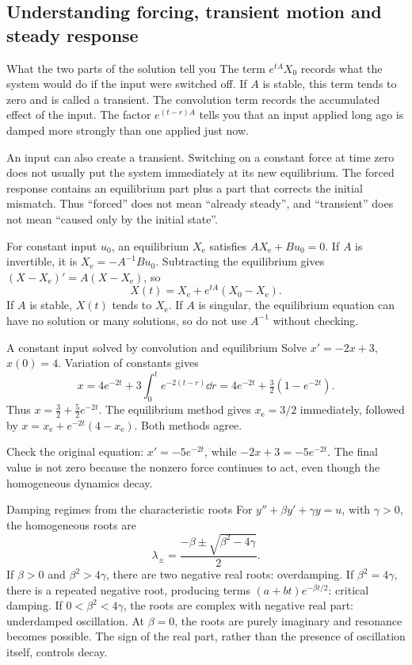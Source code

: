 \subsection{Understanding forcing, transient motion and steady response}
\begin{concept}{What the two parts of the solution tell you}
The term $e^{tA}X_0$ records what the system would do if the input were switched off. If $A$ is stable, this term tends to zero and is called a transient. The convolution term records the accumulated effect of the input. The factor $e^{(t-r)A}$ tells you that an input applied long ago is damped more strongly than one applied just now.

An input can also create a transient. Switching on a constant force at time zero does not usually put the system immediately at its new equilibrium. The forced response contains an equilibrium part plus a part that corrects the initial mismatch. Thus ``forced'' does not mean ``already steady'', and ``transient'' does not mean ``caused only by the initial state''.

For constant input $u_0$, an equilibrium $X_{\mathrm e}$ satisfies $AX_{\mathrm e}+Bu_0=0$. If $A$ is invertible, it is $X_{\mathrm e}=-A^{-1}Bu_0$. Subtracting the equilibrium gives $(X-X_{\mathrm e})'=A(X-X_{\mathrm e})$, so
\[X(t)=X_{\mathrm e}+e^{tA}(X_0-X_{\mathrm e}).\]
If $A$ is stable, $X(t)$ tends to $X_{\mathrm e}$. If $A$ is singular, the equilibrium equation can have no solution or many solutions, so do not use $A^{-1}$ without checking.
\end{concept}
\begin{worked}{A constant input solved by convolution and equilibrium}
Solve $x'=-2x+3$, $x(0)=4$. Variation of constants gives
\[x=4e^{-2t}+3\int_0^t e^{-2(t-r)}\dd r=4e^{-2t}+\tfrac32(1-e^{-2t}).\]
Thus $x=\tfrac32+\tfrac52e^{-2t}$. The equilibrium method gives $x_{\mathrm e}=3/2$ immediately, followed by $x=x_{\mathrm e}+e^{-2t}(4-x_{\mathrm e})$. Both methods agree.

Check the original equation: $x'=-5e^{-2t}$, while $-2x+3=-5e^{-2t}$. The final value is not zero because the nonzero force continues to act, even though the homogeneous dynamics decay.
\end{worked}
\begin{concept}{Damping regimes from the characteristic roots}
For $y''+\beta y'+\gamma y=u$, with $\gamma>0$, the homogeneous roots are
\[\lambda_{\pm}=\frac{-\beta\pm\sqrt{\beta^2-4\gamma}}2.\]
If $\beta>0$ and $\beta^2>4\gamma$, there are two negative real roots: overdamping. If $\beta^2=4\gamma$, there is a repeated negative root, producing terms $(a+bt)e^{-\beta t/2}$: critical damping. If $0<\beta^2<4\gamma$, the roots are complex with negative real part: underdamped oscillation. At $\beta=0$, the roots are purely imaginary and resonance becomes possible. The sign of the real part, rather than the presence of oscillation itself, controls decay.
\end{concept}
